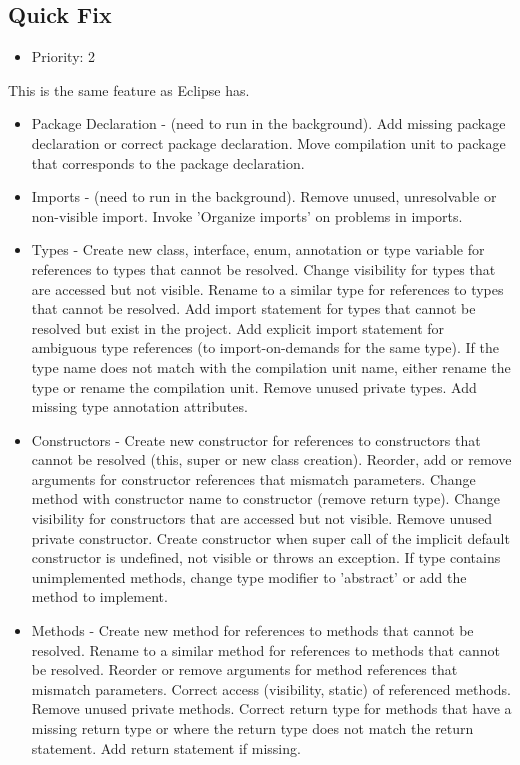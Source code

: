 \subsection{Quick Fix}
\begin{itemize}
	\item Priority: 2
\end{itemize}
This is the same feature as Eclipse has.
\begin{itemize}
	\item Package Declaration - (need to run in the background). Add missing package declaration or correct package declaration. Move compilation unit to package that corresponds to the package declaration.
	\item Imports - (need to run in the background). Remove unused, unresolvable or non-visible import. Invoke 'Organize imports' on problems in imports.
	\item Types - Create new class, interface, enum, annotation or type variable for references to types that cannot be resolved. Change visibility for types that are accessed but not visible. Rename to a similar type for references to types that cannot be resolved. Add import statement for types that cannot be resolved but exist in the project. Add explicit import statement for ambiguous type references (to import-on-demands for the same type). If the type name does not match with the compilation unit name, either rename the type or rename the compilation unit. Remove unused private types. Add missing type annotation attributes.
	\item Constructors - Create new constructor for references to constructors that cannot be resolved (this, super or new class creation). Reorder, add or remove arguments for constructor references that mismatch parameters. Change method with constructor name to constructor (remove return type). Change visibility for constructors that are accessed but not visible. Remove unused private constructor. Create constructor when super call of the implicit default constructor is undefined, not visible or throws an exception. If type contains unimplemented methods, change type modifier to 'abstract' or add the method to implement.
	\item Methods - Create new method for references to methods that cannot be resolved. Rename to a similar method for references to methods that cannot be resolved. Reorder or remove arguments for method references that mismatch parameters. Correct access (visibility, static) of referenced methods. Remove unused private methods. Correct return type for methods that have a missing return type or where the return type does not match the return statement. Add return statement if missing.

\end{itemize}
